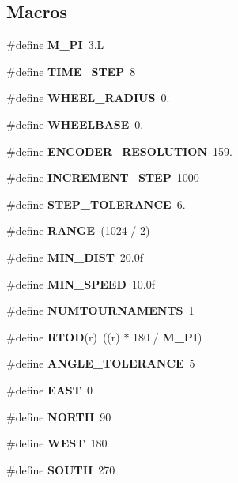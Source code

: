 \subsection*{Macros}
\begin{DoxyCompactItemize}
\item 
\#define {\bf M\-\_\-\-P\-I}~3.\-L
\item 
\#define {\bf T\-I\-M\-E\-\_\-\-S\-T\-E\-P}~8
\item 
\#define {\bf W\-H\-E\-E\-L\-\_\-\-R\-A\-D\-I\-U\-S}~0.
\item 
\#define {\bf W\-H\-E\-E\-L\-B\-A\-S\-E}~0.
\item 
\#define {\bf E\-N\-C\-O\-D\-E\-R\-\_\-\-R\-E\-S\-O\-L\-U\-T\-I\-O\-N}~159.
\item 
\#define {\bf I\-N\-C\-R\-E\-M\-E\-N\-T\-\_\-\-S\-T\-E\-P}~1000
\item 
\#define {\bf S\-T\-E\-P\-\_\-\-T\-O\-L\-E\-R\-A\-N\-C\-E}~6.
\item 
\#define {\bf R\-A\-N\-G\-E}~(1024 / 2)
\item 
\#define {\bf M\-I\-N\-\_\-\-D\-I\-S\-T}~20.\-0f
\item 
\#define {\bf M\-I\-N\-\_\-\-S\-P\-E\-E\-D}~10.\-0f
\item 
\#define {\bf N\-U\-M\-T\-O\-U\-R\-N\-A\-M\-E\-N\-T\-S}~1
\item 
\#define {\bf R\-T\-O\-D}(r)~((r) $\ast$ 180 / {\bf M\-\_\-\-P\-I})
\item 
\#define {\bf A\-N\-G\-L\-E\-\_\-\-T\-O\-L\-E\-R\-A\-N\-C\-E}~5
\item 
\#define {\bf E\-A\-S\-T}~0
\item 
\#define {\bf N\-O\-R\-T\-H}~90
\item 
\#define {\bf W\-E\-S\-T}~180
\item 
\#define {\bf S\-O\-U\-T\-H}~270
\end{DoxyCompactItemize}
